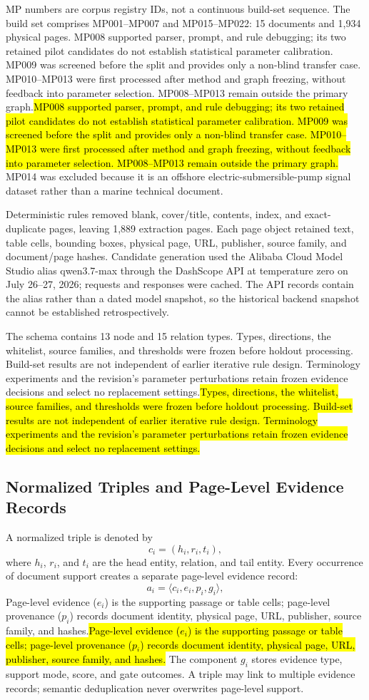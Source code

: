 \documentclass[conference,a4paper]{IEEEtran}
\DeclareRobustCommand{\rev}[1]{\ifdefined\CleanVersion#1\else\hl{#1}\fi}
\begin{document}
MP numbers are corpus registry IDs, not a continuous build-set sequence. The build set comprises MP001--MP007 and MP015--MP022: 15 documents and 1,934 physical pages. \rev{MP008 supported parser, prompt, and rule debugging; its two retained pilot candidates do not establish statistical parameter calibration. MP009 was screened before the split and provides only a non-blind transfer case. MP010--MP013 were first processed after method and graph freezing, without feedback into parameter selection. MP008--MP013 remain outside the primary graph.} MP014 was excluded because it is an offshore electric-submersible-pump signal dataset rather than a marine technical document.

Deterministic rules removed blank, cover/title, contents, index, and exact-duplicate pages, leaving 1,889 extraction pages. Each page object retained text, table cells, bounding boxes, physical page, URL, publisher, source family, and document/page hashes. Candidate generation used the Alibaba Cloud Model Studio alias \mbox{qwen3.7-max} through the DashScope API at temperature zero on July 26--27, 2026; requests and responses were cached. The API records contain the alias rather than a dated model snapshot, so the historical backend snapshot cannot be established retrospectively.

The schema contains 13 node and 15 relation types. \rev{Types, directions, the whitelist, source families, and thresholds were frozen before holdout processing. Build-set results are not independent of earlier iterative rule design. Terminology experiments and the revision's parameter perturbations retain frozen evidence decisions and select no replacement settings.}

\subsection{Normalized Triples and Page-Level Evidence Records}

A normalized triple is denoted by
\begin{equation}
c_i=(h_i,r_i,t_i),
\label{eq:triple}
\end{equation}
where $h_i$, $r_i$, and $t_i$ are the head entity, relation, and tail entity. Every occurrence of document support creates a separate page-level evidence record:
\begin{equation}
a_i=\langle c_i,e_i,p_i,g_i\rangle,
\label{eq:evidence}
\end{equation}
\rev{Page-level evidence ($e_i$) is the supporting passage or table cells; page-level provenance ($p_i$) records document identity, physical page, URL, publisher, source family, and hashes.} The component $g_i$ stores evidence type, support mode, score, and gate outcomes. A triple may link to multiple evidence records; semantic deduplication never overwrites page-level support.
\end{document}
